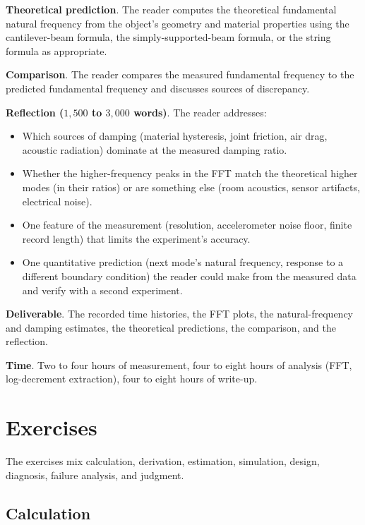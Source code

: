 \begin{project}
\textbf{Theoretical prediction}. The reader computes the
theoretical fundamental natural frequency from the object's geometry
and material properties using the cantilever-beam formula, the
simply-supported-beam formula, or the string formula as
appropriate.

\textbf{Comparison}. The reader compares the measured fundamental
frequency to the predicted fundamental frequency and discusses
sources of discrepancy.

\textbf{Reflection ($1{,}500$ to $3{,}000$ words)}. The reader
addresses:

\begin{itemize}[leftmargin=*]
  \item Which sources of damping (material hysteresis, joint
    friction, air drag, acoustic radiation) dominate at the
    measured damping ratio.
  \item Whether the higher-frequency peaks in the FFT match the
    theoretical higher modes (in their ratios) or are something
    else (room acoustics, sensor artifacts, electrical noise).
  \item One feature of the measurement (resolution, accelerometer
    noise floor, finite record length) that limits the experiment's
    accuracy.
  \item One quantitative prediction (next mode's natural frequency,
    response to a different boundary condition) the reader could
    make from the measured data and verify with a second
    experiment.
\end{itemize}

\textbf{Deliverable}. The recorded time histories, the FFT plots,
the natural-frequency and damping estimates, the theoretical
predictions, the comparison, and the reflection.

\textbf{Time}. Two to four hours of measurement, four to eight hours
of analysis (FFT, log-decrement extraction), four to eight hours of
write-up.
\end{project}

\section{Exercises}

The exercises mix calculation, derivation, estimation, simulation,
design, diagnosis, failure analysis, and judgment.

\subsection*{Calculation}

